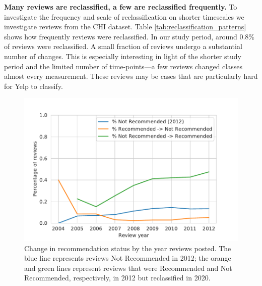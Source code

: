 \textbf{Many reviews are reclassified, a few are reclassified frequently.} To investigate the frequency and scale of reclassification on shorter timescales we investigate reviews from the CHI dataset. Table \ref{tab:reclassification_patterns} shows how frequently reviews were reclassified. In our study period, around 0.8\% of reviews were reclassified. A small fraction of reviews undergo a substantial number of changes. This is especially interesting in light of the shorter study period and the limited number of time-points---a few reviews changed classes almost every measurement. These reviews may be cases that are particularly hard for Yelp to classify. 


\begin{figure}[t]
    \centering
    \includegraphics[width=0.9\columnwidth]{chapters/reviews/figures/filtering_changes.pdf}
    \caption{Change in recommendation status by the year reviews posted. The blue line represents reviews Not Recommended in 2012; the orange and green lines represent reviews that were Recommended and Not Recommended, respectively, in 2012 but reclassified in 2020. %
    }
    \label{fig:filtered_change}
\end{figure}

